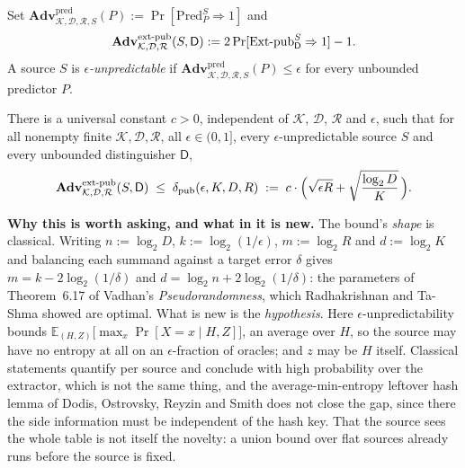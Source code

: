 \documentclass{aicr-conjecture}
\newcommand{\Adv}{\mathbf{Adv}}
\newcommand{\Pred}{\mathrm{Pred}}
\newcommand{\ExtP}{\mathrm{Ext}\text{-}\mathrm{pub}}
\newcommand{\pred}{\mathrm{pred}}
\newcommand{\extpub}{\textup{ext-pub}}
\newcommand{\calK}{\mathcal{K}}
\newcommand{\calD}{\mathcal{D}}
\newcommand{\calR}{\mathcal{R}}
\begin{document}
\begin{definition}\label{def:games}
Set $\Adv^{\pred}_{\calK,\calD,\calR,S}(P) := \Pr[\Pred^{S}_{P} \Rightarrow 1]$ and
\[
  \Adv^{\extpub}_{\calK,\calD,\calR}(S,\mathsf{D}) := 2\Pr[\ExtP^{S}_{\mathsf{D}} \Rightarrow 1] - 1 .
\]
A source $S$ is \emph{$\epsilon$-unpredictable} if
$\Adv^{\pred}_{\calK,\calD,\calR,S}(P) \le \epsilon$ for every unbounded predictor $P$.
\end{definition}

\begin{conjecture}\label{conj:pub}
There is a universal constant $c > 0$, independent of $\calK$, $\calD$, $\calR$ and $\epsilon$, such
that for all nonempty finite $\calK, \calD, \calR$, all $\epsilon \in (0,1]$, every
$\epsilon$-unpredictable source $S$ and every unbounded distinguisher $\mathsf{D}$,
\[
  \Adv^{\extpub}_{\calK,\calD,\calR}(S,\mathsf{D})
  \;\le\; \delta_{\mathrm{pub}}(\epsilon, K, D, R)
  \;:=\; c \cdot \Bigl( \sqrt{\epsilon R} + \sqrt{\frac{\log_2 D}{K}} \,\Bigr) .
\]
\end{conjecture}

\bigskip
\noindent\textbf{Why this is worth asking, and what in it is new.}
The bound's \emph{shape} is classical. Writing $n := \log_2 D$, $k := \log_2(1/\epsilon)$,
$m := \log_2 R$ and $d := \log_2 K$ and balancing each summand against a target error $\delta$
gives $m = k - 2\log_2(1/\delta)$ and $d = \log_2 n + 2\log_2(1/\delta)$: the parameters of
Theorem~6.17 of Vadhan's \emph{Pseudorandomness}, which Radhakrishnan and Ta-Shma showed are
optimal. What is new is the \emph{hypothesis}. Here $\epsilon$-unpredictability bounds
$\mathbb{E}_{(H,Z)}\bigl[\max_x \Pr[X = x \mid H,Z]\bigr]$, an average over $H$, so the source may
have no entropy at all on an $\epsilon$-fraction of oracles; and $z$ may be $H$ itself. Classical
statements quantify per source and conclude with high probability over the extractor, which is not
the same thing, and the average-min-entropy leftover hash lemma of Dodis, Ostrovsky, Reyzin and
Smith does not close the gap, since there the side information must be independent of the hash key.
That the source sees the whole table is not itself the novelty: a union bound over flat sources
already runs before the source is fixed.
\end{document}
